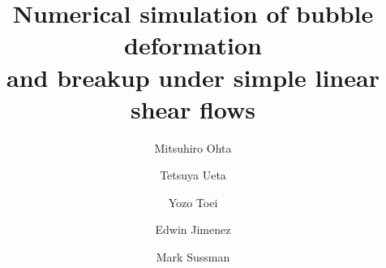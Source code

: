 \documentclass[review]{elsarticle}
\begin{document}
\begin{frontmatter}



\title{Numerical simulation of bubble deformation \\
       and breakup under simple linear shear flows}

\author[1,2]{Mitsuhiro Ohta} 
\address[1]{
  organization={Department of Mechanical Science, Graduate School of Technology, 
                Industrial and Social Sciences, Tokushima University},
  addressline={2-1 Minamijyousanjima-cho},
  state={Tokushima 770-8506}, 
  country={Japan}}
\address[2]{
  organization={Department of Mechanical Engineering, Graduate School of Technology, 
                Industrial and Social Sciences, Tokushima University},
  addressline={2-1 Minamijyousanjima-cho},
  state={Tokushima 770-8506}, 
  country={Japan}}

\author[2]{Tetsuya Ueta}
\author[3]{Yozo Toei}

\address[3]{
  organization={High Performance Plastics Company, Sekisui Chemical Co., Ltd.},
  addressline={2-1 Hyakuyama, Mishimagun Shimamoto-cho},
  state={Osaka 618-0021}, 
  country={Japan}}


\author[4]{Edwin Jimenez}  
\address[4]{
  organization={Spectral Numerical, LLC},
  addressline={1942 Broadway St., STE 314C},
  city={Boulder},
  state={CO 80302},
  country={USA}}

\author[5]{Mark Sussman}  
\address[5]{
  organization={Department of Mathematics, Florida State University},
  city={Tallahassee},
  state={FL 32306},
  country={USA}}


\end{frontmatter}
\end{document}
